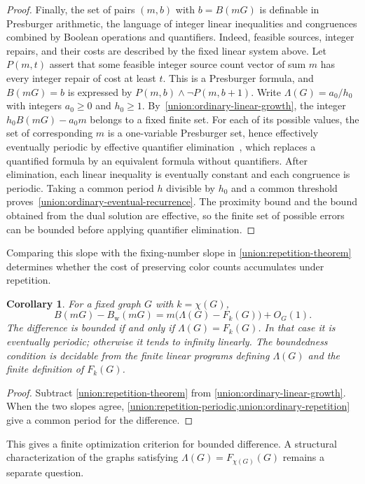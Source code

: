 \documentclass[11pt,reqno]{amsart}
\numberwithin{equation}{section}
\newtheorem{corollary}[theorem]{Corollary}
\theoremstyle{definition}
\theoremstyle{remark}
\begin{document}
\begin{proof}
Finally, the set of pairs $(m,b)$ with $b=B(mG)$ is definable in
Presburger arithmetic, the language of integer linear inequalities
and congruences combined by Boolean operations and quantifiers.
Indeed, feasible sources,
integer repairs, and their costs are described by the fixed linear
system above. Let $P(m,t)$ assert that some feasible integer source
count vector of sum $m$ has every integer repair of cost at least $t$.
This is a Presburger formula, and $B(mG)=b$ is expressed by
$P(m,b)\wedge\neg P(m,b+1)$. Write $\Lambda(G)=a_0/h_0$ with
integers $a_0\ge0$ and $h_0\ge1$.
By~\eqref{union:ordinary-linear-growth}, the integer
$h_0B(mG)-a_0m$ belongs to a fixed finite set.
For each of its possible values, the set of corresponding $m$ is a
one-variable Presburger set, hence effectively eventually periodic
by effective quantifier elimination~\cite{ginsburg1966,haase2024},
which replaces a quantified formula by an equivalent formula without
quantifiers. After elimination, each
linear inequality is eventually constant and each congruence is
periodic. Taking a common period $h$ divisible by $h_0$ and a common
threshold proves~\eqref{union:ordinary-eventual-recurrence}.
The proximity bound and the bound obtained from the dual solution
are effective, so
the finite set of possible errors can be bounded before applying
quantifier elimination.
\end{proof}

Comparing this slope with the fixing-number slope in
\cref{union:repetition-theorem} determines whether the cost of preserving
color counts accumulates under repetition.

\begin{corollary}\label{union:repetition-gap}
For a fixed graph $G$ with $k=\chi(G)$,
\[
 B(mG)-B_{\mathrm w}(mG)
   =m\bigl(\Lambda(G)-F_k(G)\bigr)+O_G(1).
\]
The difference is bounded if and only if $\Lambda(G)=F_k(G)$.
In that case it is eventually periodic; otherwise it tends to
infinity linearly. The boundedness condition is decidable from the
finite linear programs defining $\Lambda(G)$ and the finite
definition of $F_k(G)$.
\end{corollary}
\begin{proof}
Subtract \cref{union:repetition-theorem} from
\eqref{union:ordinary-linear-growth}. When the two slopes agree,
\cref{union:repetition-periodic,union:ordinary-repetition} give a
common period for the difference.
\end{proof}

This gives a finite optimization criterion for bounded difference.
A structural characterization of the graphs satisfying
$\Lambda(G)=F_{\chi(G)}(G)$ remains a separate question.
\end{document}
